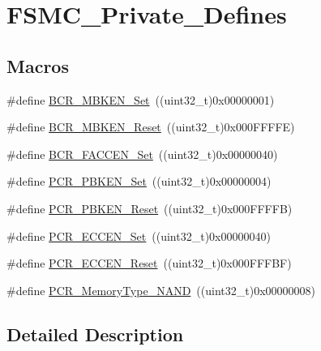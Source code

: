 \hypertarget{group___f_s_m_c___private___defines}{}\section{F\+S\+M\+C\+\_\+\+Private\+\_\+\+Defines}
\label{group___f_s_m_c___private___defines}
\subsection*{Macros}
\begin{DoxyCompactItemize}
\item 
\#define \mbox{\hyperlink{group___f_s_m_c___private___defines_ga3c427afcf32b17fb72be67fd4638e6d5}{B\+C\+R\+\_\+\+M\+B\+K\+E\+N\+\_\+\+Set}}~((uint32\+\_\+t)0x00000001)
\item 
\#define \mbox{\hyperlink{group___f_s_m_c___private___defines_gaa63b72d32a32c53a057ee0a45bed0d3b}{B\+C\+R\+\_\+\+M\+B\+K\+E\+N\+\_\+\+Reset}}~((uint32\+\_\+t)0x000\+F\+F\+F\+F\+E)
\item 
\#define \mbox{\hyperlink{group___f_s_m_c___private___defines_ga38da33a73789b2c932962d75dfc1341f}{B\+C\+R\+\_\+\+F\+A\+C\+C\+E\+N\+\_\+\+Set}}~((uint32\+\_\+t)0x00000040)
\item 
\#define \mbox{\hyperlink{group___f_s_m_c___private___defines_gade871050f882b7f48582084b0e95f67c}{P\+C\+R\+\_\+\+P\+B\+K\+E\+N\+\_\+\+Set}}~((uint32\+\_\+t)0x00000004)
\item 
\#define \mbox{\hyperlink{group___f_s_m_c___private___defines_gac6d0ddc3888a0554b032f0f484cfe332}{P\+C\+R\+\_\+\+P\+B\+K\+E\+N\+\_\+\+Reset}}~((uint32\+\_\+t)0x000\+F\+F\+F\+F\+B)
\item 
\#define \mbox{\hyperlink{group___f_s_m_c___private___defines_ga8a0d7950936e3869b449d421e03a19ac}{P\+C\+R\+\_\+\+E\+C\+C\+E\+N\+\_\+\+Set}}~((uint32\+\_\+t)0x00000040)
\item 
\#define \mbox{\hyperlink{group___f_s_m_c___private___defines_gaca1a5c5cd46c8a32dab58c3eb3b865fa}{P\+C\+R\+\_\+\+E\+C\+C\+E\+N\+\_\+\+Reset}}~((uint32\+\_\+t)0x000\+F\+F\+F\+B\+F)
\item 
\#define \mbox{\hyperlink{group___f_s_m_c___private___defines_gaf3992efb285ab994c41463af5107c501}{P\+C\+R\+\_\+\+Memory\+Type\+\_\+\+N\+A\+ND}}~((uint32\+\_\+t)0x00000008)
\end{DoxyCompactItemize}


\subsection{Detailed Description}



